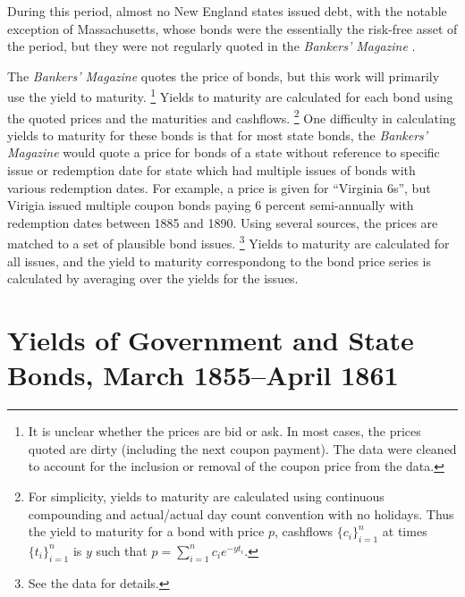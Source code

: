 \documentclass[11pt, oneside, article]{memoir}\usepackage[]{graphicx}\usepackage[]{color}
\begin{document}
During this period, almost no New England states issued debt, with the notable exception of Massachusetts, whose bonds were the essentially the risk-free asset of the period, but they were not regularly quoted in the \textit{Bankers' Magazine} \parencites[86]{Martin1871}{HomerSylla2005}{Macaulay1938}[80-85]{Officer2003}.

The \textit{Bankers' Magazine} quotes the price of bonds, but this work will primarily use the yield to maturity.%
\footnote{It is unclear whether the prices are bid or ask. In most cases, the prices quoted are dirty (including the next coupon payment). The data were cleaned to account for the inclusion or removal of the coupon price from the data.}
Yields to maturity are calculated for each bond using the quoted prices and the maturities and cashflows.
\footnote{
  For simplicity, yields to maturity are calculated using continuous compounding and actual/actual day count convention with no holidays.
  Thus the yield to maturity for a bond with price $p$, cashflows $\{c_{i}\}_{i = 1}^{n}$ at times $\{t_{i}\}_{i=1}^{n}$ is $y$ such that $p = \sum_{i=1}^{n} c_{i} e^{- y t_{i}}$.
}
One difficulty in calculating yields to maturity for these bonds is that for most state bonds, the \textit{Bankers' Magazine} would quote a price for bonds of a state without reference to specific issue or redemption date for state which had multiple issues of bonds with various redemption dates.
For example, a price is given for ``Virginia 6s'', but Virigia issued multiple coupon bonds paying 6 percent semi-annually with redemption dates between 1885 and 1890.
Using several sources, the prices are matched to a set of plausible bond issues.%
\footnote{See the data for details.}
Yields to maturity are calculated for all issues, and the yield to maturity correspondong to the bond price series is calculated by averaging over the yields for the issues.

\section{Yields of Government and State Bonds, March 1855--April 1861}
\label{sec:yields-governm-state}
\end{document}
